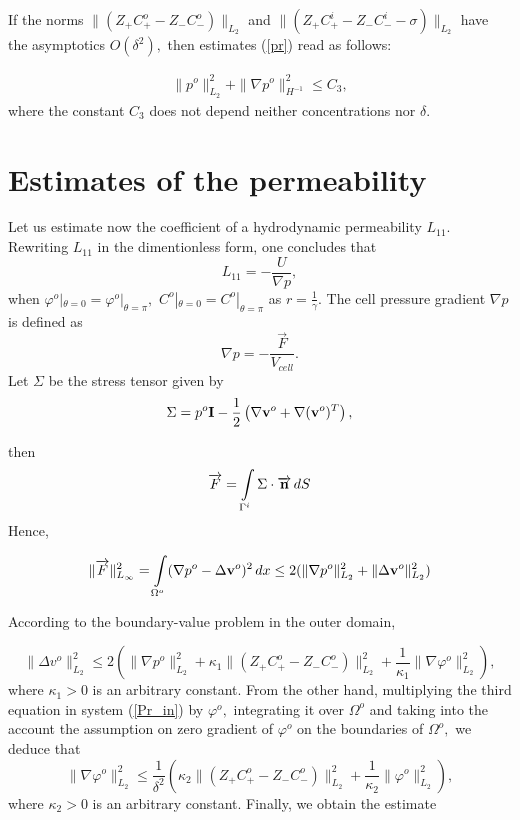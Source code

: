 \documentclass{amsart}
\begin{document}
\begin{remark}
If the norms $\|\left(Z_{+}C^o_{+}-Z_{-}C^o_{-}\right)\|_{L_{2}}$ and $\|\left(Z_{+}C^i_{+}-Z_{-}C^i_{-}-\sigma\right)\|_{L_{2}}$ have the asymptotics $O(\delta^2),$ then estimates (\ref{pr}) read as follows:

\begin{equation}\label{prdelta}
\begin{aligned}
\| p^o\|^2_{L_2}+\| \nabla p^o\|^2_{H^{-1}}\leq C_3,
\end{aligned}
\end{equation}
where the constant $C_3$ does not depend neither concentrations nor $\delta.$
\end{remark}
\section{Estimates of the permeability}

Let us estimate now the coefficient of a hydrodynamic permeability $L_{11}.$ Rewriting $L_{11}$ in the dimentionless form, one concludes that
$${L}_{11}=-\frac{{U}}{{\nabla} {p}},$$ when  $\varphi^o|_{\theta=0}=\varphi^o|_{\theta=\pi},$ $C^o|_{\theta=0}=C^o|_{\theta=\pi}$ as  $r=\frac{1}{\gamma}.$
The cell pressure gradient $\nabla p$ is defined as  $$\nabla p=-\frac{\overrightarrow{F}}{V_{cell}}.$$
Let $\Sigma$ be the stress tensor given by
$$\Sigma=p^o{\mathbf I}-\frac{1}{2}\left(\nabla {\bf v}^o+ \nabla ({\bf v}^o)^T\right),$$

then $$\overrightarrow{F}=\int\limits_{\Gamma^i}\Sigma\cdot {\overrightarrow{\bf n}}\,dS$$
Hence,

$$\|\overrightarrow{F}\|^2_{L_\infty}=\int\limits_{\Omega^o}(\nabla p^o-\Delta {\bf v}^o)^2\,dx\leq 2(\|\nabla p^o\|^2_{L_2}+\|\Delta {\bf v}^o\|^2_{L_2})$$

According to the boundary-value problem in the outer domain,

$$\|\Delta v^o\|^2_{L_2}\leq 2\left(\|\nabla p^o\|^2_{L_2}+\kappa_1\|\left(Z_{+}C^o_{+}-Z_{-}C^o_{-}\right)\|_{L_2}^2+\frac{1}{\kappa_1}\|\nabla \varphi^o\|^2_{L_2}\right),$$
where $\kappa_1>0$ is an arbitrary constant.
From the other hand, multiplying the third  equation in system (\ref{Pr_in}) by $\varphi^o,$ integrating it over $\Omega^o$ and taking into the account the assumption on zero gradient of $\varphi^o$ on the boundaries of $\Omega^o,$ we deduce that
$$\|\nabla \varphi^o\|^2_{L_2}\leq \frac{1}{\delta^2}\left(\kappa_2\|\left(Z_{+}C^o_{+}-Z_{-}C^o_{-}\right)\|_{L_2}^2+\frac{1}{\kappa_2}\|\varphi^o\|^2_{L_2}\right),$$
where $\kappa_2>0$ is an arbitrary constant.
Finally, we obtain the estimate
\end{document}
